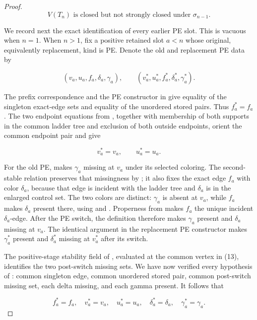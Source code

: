\begin{proof}
\[
 V(T_n)\text{ is closed but not strongly closed under }
 \sigma_{n-1}.                                                \tag{11}
\]

We record next the exact identification of every earlier PE slot.  This is
vacuous when \(n=1\).  When \(n>1\), fix a positive retained slot \(a<n\)
whose original, equivalently replacement, kind is PE.  Denote the old and
replacement PE data by

\[
 (v_a,u_a,f_a,\delta_a,\gamma_a),\qquad
 (v_a^*,u_a^*,f_a^*,\delta_a^*,\gamma_a^*).                  \tag{12}
\]

The prefix correspondence and the PE constructor in
 give equality of the singleton exact-edge
sets and equality of the unordered stored pairs.  Thus
\(f_a^*=f_a\).  The two endpoint equations from
, together with membership of both
supports in the common ladder tree and exclusion of both outside endpoints,
orient the common endpoint pair and give

\[
                         v_a^*=v_a,\qquad u_a^*=u_a.           \tag{13}
\]

For the old PE,  makes \(\gamma_a\)
missing at \(v_a\) under its selected coloring.  The second-stable
relation preserves that missingness by ; it also
fixes the exact edge \(f_a\) with color \(\delta_a\), because that edge
is incident with the ladder tree and \(\delta_a\) is in the enlarged
control set.  The two colors are distinct: \(\gamma_a\) is absent at
\(v_a\), while \(f_a\) makes \(\delta_a\) present there, using
 and .  Properness from
 makes \(f_a\) the unique incident
\(\delta_a\)-edge.  After the PE switch, the definition
 therefore makes \(\gamma_a\) present
and \(\delta_a\) missing at \(v_a\).  The identical argument in the
replacement PE constructor makes \(\gamma_a^*\) present and
\(\delta_a^*\) missing at \(v_a^*\) after its switch.

The positive-stage stability field of
, evaluated at the common
vertex in (13), identifies the two post-switch missing sets.  We have now
verified every hypothesis of
: common singleton edge, common
unordered stored pair, common post-switch missing set, each delta missing,
and each gamma present.  It follows that

\[
 f_a^*=f_a,\quad v_a^*=v_a,\quad u_a^*=u_a,\quad
 \delta_a^*=\delta_a,\quad\gamma_a^*=\gamma_a.               \tag{14}
\]


\end{proof}
